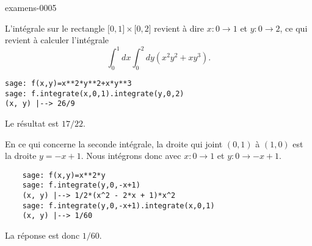 
\begin{corrige}{examens-0005}


    L'intégrale sur le rectangle \( \mathopen[ 0 , 1 \mathclose]\times \mathopen[ 0 , 2 \mathclose]\) revient à dire \( x\colon 0\to 1\) et \( y\colon 0\to 2\), ce qui revient à calculer l'intégrale
    \begin{equation}
        \int_0^1dx\int_0^2dy(x^2y^2+xy^3).
    \end{equation}
    \begin{verbatim}
sage: f(x,y)=x**2*y**2+x*y**3
sage: f.integrate(x,0,1).integrate(y,0,2)
(x, y) |--> 26/9
    \end{verbatim}
    Le résultat est \( 17/22\).

    En ce qui concerne la seconde intégrale, la droite qui joint \( (0,1)\) à \( (1,0)\) est la droite \( y=-x+1\). Nous intégrons donc avec \( x\colon 0\to 1\) et \( y\colon 0\to -x+1\).
    \begin{verbatim}
    sage: f(x,y)=x**2*y
    sage: f.integrate(y,0,-x+1)
    (x, y) |--> 1/2*(x^2 - 2*x + 1)*x^2
    sage: f.integrate(y,0,-x+1).integrate(x,0,1)
    (x, y) |--> 1/60
    \end{verbatim}
    La réponse est donc \( 1/60\).


\end{corrige}
